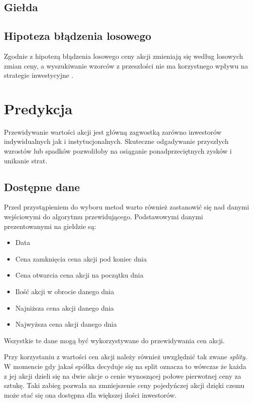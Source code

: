 \documentclass[a4paper, twoside, 11pt, openright]{article}
\begin{document}
\subsection{Giełda}

\subsection{Hipoteza błądzenia losowego}

Zgodnie z hipotezą błądzenia losowego ceny akcji zmieniają się według losowych zmian ceny, a wyszukiwanie wzorców z przeszłości nie ma korzystnego wpływu na strategie inwestycyjne  \cite{randwalk}. 

\section{Predykcja}

Przewidywanie wartości akcji jest główną zagwostką zarówno inwestorów indywidualnych jak i instytucjonalnych. Skuteczne odgadywanie przyszłych wzrostów lub spadków pozwoliłoby na osiąganie ponadprzeciętnych zysków i unikanie strat.

\subsection{Dostępne dane}

Przed przystąpieniem do wyboru metod warto również zastanowić się nad danymi wejściowymi do algorytmu przewidującego. Podstawowymi danymi prezentowanymi na giełdzie są:
\begin{itemize}
\item{Data}
\item{Cena zamknięcia} cena akcji pod koniec dnia
\item{Cena otwarcia} cena akcji na początku dnia
\item{Ilość akcji w obrocie danego dnia}
\item{Najniższa cena akcji danego dnia}
\item{Najwyższa cena akcji danego dnia}
\end{itemize}

Wszystkie te dane mogą być wykorzystywane do przewidywania cen akcji.

 Przy korzystaniu z wartości cen akcji należy również uwzględnić tak zwane \textit{splity}. W momencie gdy jakaś spółka decyduje się na split oznacza to wówczas że każda z jej akcji dzieli się na dwie akcje o cenie wynoszącej połowe pierwotnej ceny za sztukę. Taki zabieg pozwala na zmniejszenie ceny pojedyńczej akcji dzięki czemu może stać się ona dostępna dla większej ilości inwestorów. 
\end{document}
